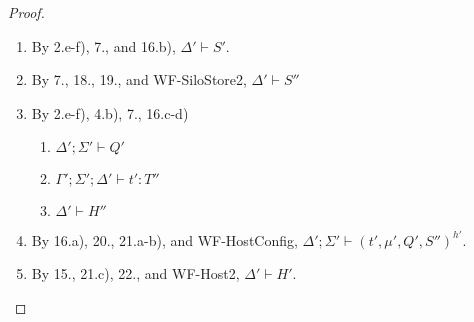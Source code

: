 \begin{proof}
\begin{itemize}
\begin{enumerate}
\item By 2.e-f), 7., and 16.b), $\Delta' \vdash S'$.
\item By 7., 18., 19., and WF-SiloStore2, $\Delta' \vdash S''$
\item By 2.e-f), 4.b), 7., 16.c-d)
  \begin{enumerate}[label=(\alph*)]
  \item $\Delta' ; \Sigma' \vdash Q'$
  \item $\Gamma' ; \Sigma' ; \Delta' \vdash t' : T''$
  \item $\Delta' \vdash H''$
  \end{enumerate}
\item By 16.a), 20., 21.a-b), and WF-HostConfig, $\Delta' ; \Sigma' \vdash (t', \mu', Q', S'')^{h'}$.
\item By 15., 21.c), 22., and WF-Host2, $\Delta' \vdash H'$.
\end{enumerate}


\end{itemize}
\end{proof}
